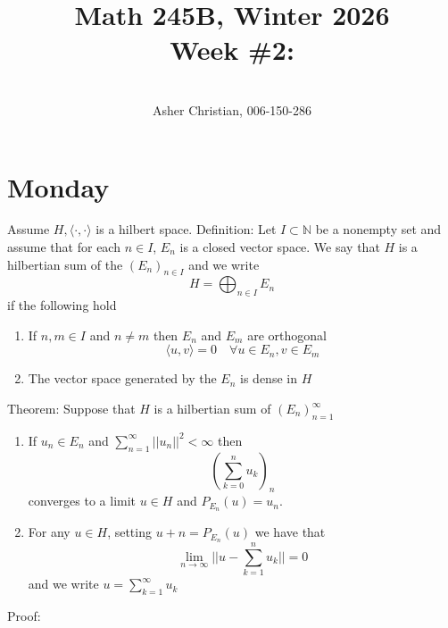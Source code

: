 \documentclass[11pt]{article}
\newcommand{\cnum}{Math 245B}
\newcommand{\ced}{Winter 2026}
\newcommand{\ctitle}[4]{\title{\vspace{-0.5in}\cnum, \ced\\Week #1: #2}\author{\vspace{-0.35in}\\#3, #4}}
\begin{document}
\ctitle{\#2}{}{Asher Christian}{006-150-286}
\date{}
\maketitle

\section{Monday}
Assume $H, \langle \cdot, \cdot \rangle$ is a hilbert space.
Definition: Let $I \subset \mathbb{N}$ be a nonempty set and assume that for each $n \in I$,  $E_n$ is a closed vector space.
We say that $H$ is a hilbertian sum of the $(E_n)_{n \in I}$ and we write 
 \[
     H = \bigoplus_{n \in I} E_n
\] 
if the following hold
\begin{enumerate}
    \item If $n,m \in I$ and  $n \ne m$ then  $E_n$ and  $E_m$ are orthogonal
         \[
        \langle u, v \rangle = 0 \quad \forall u \in E_n, v \in E_m
        \] 
    \item The vector space generated by the $E_n$ is dense in  $H$
\end{enumerate}
Theorem: Suppose that $H$ is a hilbertian sum of $(E_n)_{n=1}^{\infty}$ 
\begin{enumerate}
    \item If $u_n \in E_n$ and  $\sum_{n=1}^{\infty}||u_n||^2 < \infty$ then
        \[
            (\sum_{k=0}^{n} u_k)_n
        \] 
        converges to a limit $u \in H$ and  $P_{E_n}(u) = u_n$.
    \item For any  $u \in H$, setting $u+n = P_{E_n}(u)$ we have that
         \[
        \lim_{n\to \infty} ||u - \sum_{k=1}^{n}u_k|| = 0
        \] 
        and we write $u = \sum_{k=1}^{\infty}u_k$
\end{enumerate}
Proof:
\end{document}
